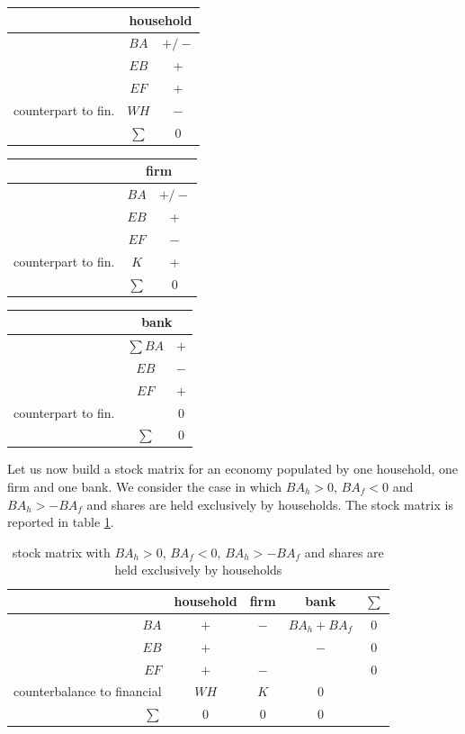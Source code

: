 \documentclass{article}
\begin{document}
\vskip5mm
\begin{center}

	\begin{tabular}{r c c }
	
		&\multicolumn{2}{c}{household}\\
\hline
&$BA$	&	$+/-$  \\
&$EB$	&	+  \\
&$EF$	&	+  \\
\hline
counterpart to fin. &$WH$	&$-$\\
\hline
&$\sum$	&	0
\end{tabular}
\hskip5mm
\begin{tabular}{r c c}
	& \multicolumn{2}{c}{firm} \\
\hline
&$BA$	&	$+/-$  \\
&$EB$	&	+  \\
&$EF$	&$-$	\\
\hline
counterpart to fin.	&$K$	& +	\\
\hline
&$\sum$		&0\\
\end{tabular}
\hskip5mm
\begin{tabular}{r c c}
	& \multicolumn{2}{c}{bank} \\
\hline
&$\sum BA$	&	$+$  \\
&$EB$	&	$-$  \\
&$EF$	&$+$	\\
\hline
counterpart to fin.	&	& 0	\\
\hline
&$\sum$		&0\\
\end{tabular}

\end{center}
\vskip5mm

Let us now build a stock matrix for an economy populated by one household, one firm and one bank. We consider the case in which $BA_h>0$, $BA_f<0$ and $BA_h>-BA_f$ and shares are held exclusively by households. The stock matrix is reported in table \ref{tab:sm1}.

\begin{table}
	\centering
\begin{tabular}{r c c c c}
	\hline
	& household 	& \parbox{1.5cm}{\centerline{firm}} & \parbox{1.5cm}{\centerline{bank}} &$\sum$\\
\hline
\hline
$BA$	&	$+$	&$-$	&$BA_h+BA_f$&0\\
$EB$	&	$+$	&	&$-$&0\\
$EF$	&	$+$	&$-$	&&0\\
	\hline
counterbalance to financial	&	$WH$	&$K$	&0\\
	\hline
	\hline
$\sum$ &	0	&0	&0
\end{tabular}
	\caption{stock matrix with $BA_h>0$, $BA_f<0$, $BA_h>-BA_f$ and shares are held exclusively by households}
	\label{tab:sm1}
\end{table}
\end{document}
